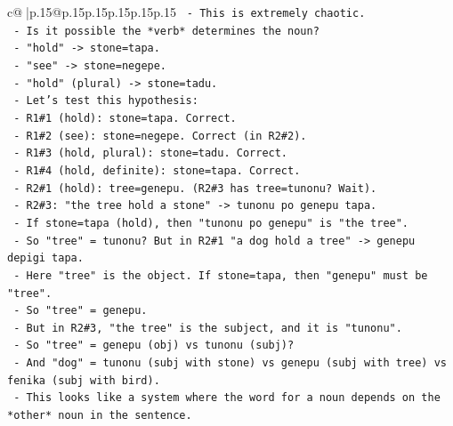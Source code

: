 \documentclass{article}
\begin{document}
{\begin{supertabular}{c@{$\;$}|p{.15\linewidth}@{}p{.15\linewidth}p{.15\linewidth}p{.15\linewidth}p{.15\linewidth}p{.15\linewidth}}
{{{\texttt{                              {-} This is extremely chaotic.} \\
\texttt{                              {-} Is it possible the *verb* determines the noun?} \\
\texttt{                                {-} "hold" {-}> stone=tapa.} \\
\texttt{                                {-} "see" {-}> stone=negepe.} \\
\texttt{                                {-} "hold" (plural) {-}> stone=tadu.} \\
\texttt{                              {-} Let's test this hypothesis:} \\
\texttt{                                {-} R1\#1 (hold): stone=tapa. Correct.} \\
\texttt{                                {-} R1\#2 (see): stone=negepe. Correct (in R2\#2).} \\
\texttt{                                {-} R1\#3 (hold, plural): stone=tadu. Correct.} \\
\texttt{                                {-} R1\#4 (hold, definite): stone=tapa. Correct.} \\
\texttt{                                {-} R2\#1 (hold): tree=genepu. (R2\#3 has tree=tunonu? Wait).} \\
\texttt{                                {-} R2\#3: "the tree hold a stone" {-}> tunonu po genepu tapa.} \\
\texttt{                                  {-} If stone=tapa (hold), then "tunonu po genepu" is "the tree".} \\
\texttt{                                  {-} So "tree" = tunonu? But in R2\#1 "a dog hold a tree" {-}> genepu depigi tapa.} \\
\texttt{                                    {-} Here "tree" is the object. If stone=tapa, then "genepu" must be "tree".} \\
\texttt{                                    {-} So "tree" = genepu.} \\
\texttt{                                    {-} But in R2\#3, "the tree" is the subject, and it is "tunonu".} \\
\texttt{                                    {-} So "tree" = genepu (obj) vs tunonu (subj)?} \\
\texttt{                                    {-} And "dog" = tunonu (subj with stone) vs genepu (subj with tree) vs fenika (subj with bird).} \\
\texttt{                                  {-} This looks like a system where the word for a noun depends on the *other* noun in the sentence.} \\
}}}
\end{supertabular}}
\end{document}
